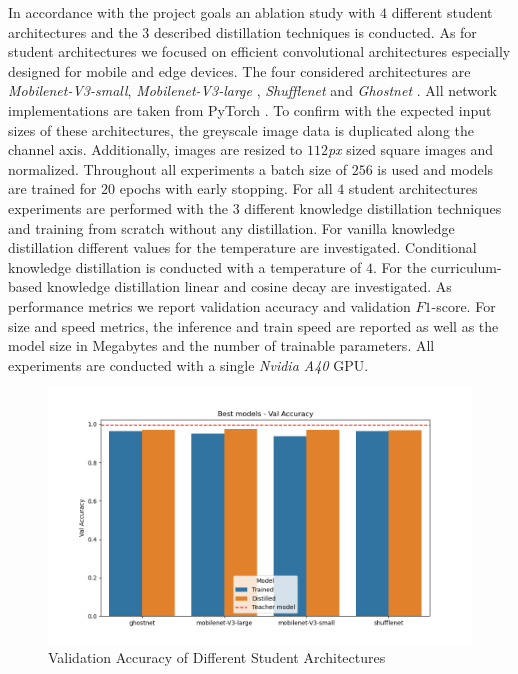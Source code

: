 \documentclass[11pt]{article}
\begin{document}
In accordance with the project goals an ablation study with $ 4 $ different student architectures and the $ 3 $ described distillation techniques is conducted. As for student architectures we focused on efficient convolutional architectures especially designed for mobile and edge devices. The four considered architectures are \textit{Mobilenet-V3-small}, \textit{Mobilenet-V3-large} \cite{mobilenetv3}, \textit{Shufflenet} \cite{shufflenet} and \textit{Ghostnet} \cite{han2020ghostnet}. All network implementations are taken from PyTorch \cite{pytorch}. To confirm with the expected input sizes of these architectures, the greyscale image data is duplicated along the channel axis. Additionally, images are resized to $ 112 $\textit{px} sized square images and normalized. Throughout all experiments a batch size of $ 256 $ is used and models are trained for $ 20 $ epochs with early stopping. For all $ 4 $ student architectures experiments are performed with the $ 3 $ different knowledge distillation techniques and training from scratch without any distillation. For vanilla knowledge distillation different values for the temperature are investigated. Conditional knowledge distillation is conducted with a temperature of $ 4 $. For the curriculum-based knowledge distillation linear and cosine decay are investigated.
As performance metrics we report validation accuracy and validation $ F1 $-score. For size and speed metrics, the inference and train speed are reported as well as the model size in Megabytes and the number  of trainable parameters.
All experiments are conducted with a single \textit{Nvidia A40} GPU. 

\begin{figure}[H]
	\centering
	\includegraphics[width=0.9\linewidth]{assets/val accuracy_Best}
	\caption{Validation Accuracy of Different Student Architectures}
	\label{fig:acc_res}
\end{figure}
\end{document}
